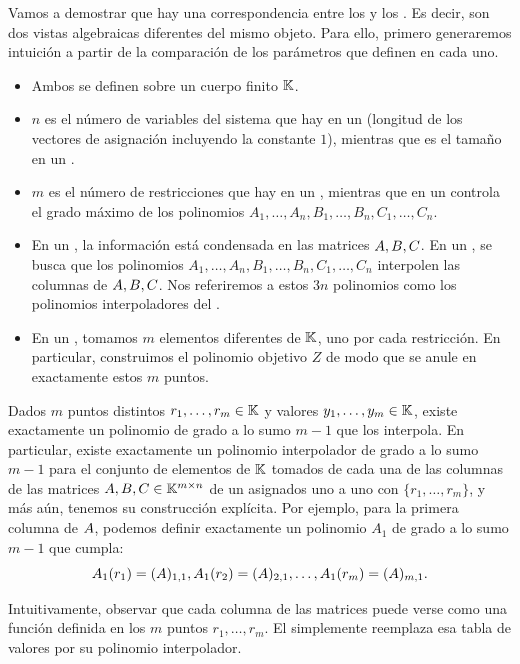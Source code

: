 Vamos a demostrar que hay una correspondencia entre los \ROneCS y los \QAP. Es decir, son dos vistas algebraicas diferentes del mismo objeto. Para ello, primero generaremos intuición a partir de la comparación de los parámetros que definen en cada uno.

\begin{itemize}[noitemsep]
	\item Ambos se definen sobre un cuerpo finito $\mathbb{K}$.
	\item $n$ es el número de variables del sistema que hay en un \ROneCS (longitud de los vectores de asignación incluyendo la constante $1$), mientras que es el tamaño en un \QAP.
	\item $m$ es el número de restricciones que hay en un \ROneCS, mientras que en un \QAP controla el grado máximo de los polinomios $A_1, \ldots, A_n, B_1, \ldots, B_n, C_1, \ldots, C_n$.
	\item En un \ROneCS, la información está condensada en las matrices $A,B,C$. En un \QAP, se busca que los polinomios $A_1, \ldots, A_n, B_1, \ldots, B_n, C_1, \ldots, C_n$ interpolen las columnas de $A,B, C$. Nos referiremos a estos $3n$ polinomios como los polinomios interpoladores del \QAP.
	\item En un \QAP, tomamos $m$ elementos diferentes de $\mathbb{K}$, uno por cada restricción. En particular, construimos el polinomio objetivo $Z$ de modo que se anule en exactamente estos $m$ puntos.
\end{itemize}

Dados $m$ puntos distintos $r_1, \ldots, r_m \in \mathbb{K}$ y valores $y_1, \ldots, y_m \in \mathbb{K}$, existe exactamente un polinomio de grado a lo sumo $m - 1$ que los interpola. En particular, existe exactamente un polinomio interpolador de grado a lo sumo $m - 1$ para el conjunto de elementos de $\mathbb{K}$ tomados de cada una de las columnas de las matrices $A, B, C \in \mathbb{K}^{m \times n}$ de un \ROneCS asignados uno a uno con $\{r_1, \ldots, r_m\}$, y más aún, tenemos su construcción explícita. Por ejemplo, para la primera columna de $A$, podemos definir exactamente un polinomio $A_1$ de grado a lo sumo $m - 1$ que cumpla:
$$A_1(r_1) = (A)_{1,1}, A_1(r_2) = (A)_{2,1}, \ldots, A_1(r_m) = (A)_{m,1}.$$

Intuitivamente, observar que cada columna de las matrices puede verse como una función definida en los $m$ puntos $r_1, \ldots, r_m$. El \QAP simplemente reemplaza esa tabla de valores por su polinomio interpolador.

